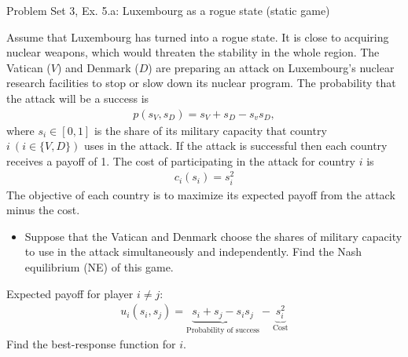 \begin{frame}{Problem Set 3, Ex. 5.a: Luxembourg as a rogue state (static game)}
  \begin{multicols}{2}
    Assume that Luxembourg has turned into a rogue state. It is close to acquiring nuclear weapons, which would threaten the stability in the whole region. The Vatican ($V$) and Denmark ($D$) are preparing an attack on Luxembourg’s nuclear research facilities to stop or slow down its nuclear program. The probability that the attack will be a success is
    \begin{align*}
      p(s_V,s_D)=s_V+s_D-s_vs_D,
    \end{align*}
    where $s_i\in[0,1]$ is the share of its military capacity that country $i\ (i\in\{V,D\})$ uses in the attack. If the attack is successful then each country receives a payoff of 1. The cost of participating in the attack for country $i$ is
    \begin{align*}
      c_i(s_i)=s_i^2
    \end{align*}
    The objective of each country is to maximize its expected payoff from the attack minus the cost.
  \vfill\null\columnbreak
    \begin{itemize}
      \item[(a)] Suppose that the Vatican and Denmark choose the shares of military capacity to use in the attack simultaneously and independently. Find the Nash equilibrium (NE) of this game.
    \end{itemize}
    Expected payoff for player $i\neq j$:
    \begin{align*}
      u_i(s_i,s_j)=\underbrace{s_i+s_j-s_is_j}_\text{Probability of success}-\underbrace{s_i^2}_\text{Cost}
    \end{align*}
    Find the best-response function for $i$.
  \vfill\null
  \end{multicols}
\end{frame}
